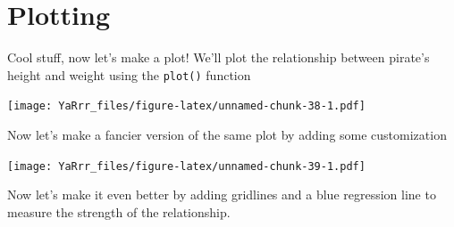\documentclass[]{book}
\newenvironment{Shaded}{\begin{snugshade}}{\end{snugshade}}
\newcommand{\KeywordTok}[1]{\textcolor[rgb]{0.13,0.29,0.53}{\textbf{{#1}}}}
\newcommand{\DataTypeTok}[1]{\textcolor[rgb]{0.13,0.29,0.53}{{#1}}}
\newcommand{\DecValTok}[1]{\textcolor[rgb]{0.00,0.00,0.81}{{#1}}}
\newcommand{\StringTok}[1]{\textcolor[rgb]{0.31,0.60,0.02}{{#1}}}
\newcommand{\CommentTok}[1]{\textcolor[rgb]{0.56,0.35,0.01}{\textit{{#1}}}}
\newcommand{\NormalTok}[1]{{#1}}
\theoremstyle{definition}
\theoremstyle{definition}
\theoremstyle{remark}
\begin{document}
\section{Plotting}\label{plotting}

Cool stuff, now let's make a plot! We'll plot the relationship between
pirate's height and weight using the \texttt{plot()} function

\begin{Shaded}
\end{Shaded}

\texttt{[image: YaRrr\_files/figure-latex/unnamed-chunk-38-1.pdf]}

Now let's make a fancier version of the same plot by adding some
customization

\begin{Shaded}
\end{Shaded}

\texttt{[image: YaRrr\_files/figure-latex/unnamed-chunk-39-1.pdf]}

Now let's make it even better by adding gridlines and a blue regression
line to measure the strength of the relationship.
\end{document}
